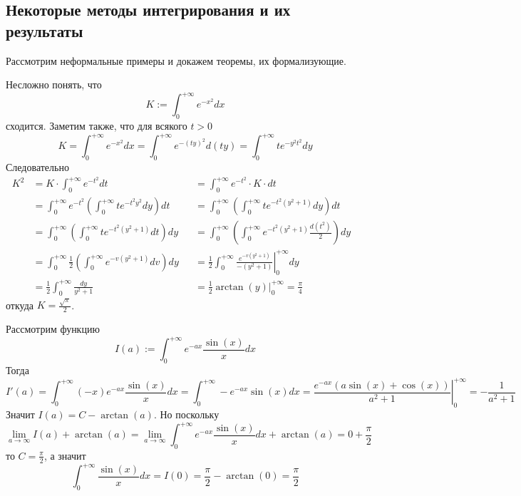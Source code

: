 \documentclass[12pt,a4paper]{article}
\begin{document}
    \subsection{Некоторые методы интегрирования и их результаты}

    Рассмотрим неформальные примеры и докажем теоремы, их формализующие.

    \begin{example}
        Несложно понять, что
        \[K := \int_0^{+\infty} e^{-x^2} dx\]
        сходится. Заметим также, что для всякого $t > 0$
        \[
            K
            = \int_0^{+\infty} e^{-x^2} dx
            = \int_0^{+\infty} e^{-(ty)^2} d(ty)
            = \int_0^{+\infty} t e^{-y^2 t^2} dy
        \]
        Следовательно
        \begin{align*}
            K^2
            &= K \cdot \int_0^{+\infty} e^{-t^2} dt&
            &= \int_0^{+\infty} e^{-t^2} \cdot K \cdot dt\\
            &= \int_0^{+\infty} e^{-t^2} \left(\int_0^{+\infty} t e^{-t^2y^2} dy\right) dt&
            &= \int_0^{+\infty} \left(\int_0^{+\infty} t e^{-t^2(y^2+1)} dy\right) dt\\
            &= \int_0^{+\infty} \left(\int_0^{+\infty} t e^{-t^2(y^2+1)} dt\right) dy&
            &= \int_0^{+\infty} \left(\int_0^{+\infty} e^{-t^2(y^2+1)} \frac{d(t^2)}{2}\right) dy\\
            &= \int_0^{+\infty} \frac{1}{2} \left(\int_0^{+\infty} e^{-v(y^2+1)} dv\right) dy&
            &= \frac{1}{2} \int_0^{+\infty} \left.\frac{e^{-v(y^2+1)}}{-(y^2+1)}\right|_0^{+\infty} dy\\
            &= \frac{1}{2} \int_0^{+\infty} \frac{dy}{y^2+1}&
            &= \frac{1}{2} \left. \arctan(y) \right|_0^{+\infty} = \frac{\pi}{4}&
        \end{align*}
        откуда $K = \frac{\sqrt{\pi}}{2}$.
    \end{example}

    \begin{example}
        Рассмотрим функцию
        \[I(a) := \int_0^{+\infty} e^{-ax} \frac{\sin(x)}{x} dx\]
        Тогда
        \[
            I'(a)
            = \int_0^{+\infty} (-x) e^{-ax} \frac{\sin(x)}{x} dx
            = \int_0^{+\infty} -e^{-ax} \sin(x) dx
            = \left.\frac{e^{-ax}(a \sin(x) + \cos(x))}{a^2 + 1}\right|_0^{+\infty}
            = -\frac{1}{a^2 + 1}
        \]
        Значит $I(a) = C - \arctan(a)$. Но поскольку
        \[
            \lim_{a \to \infty} I(a) + \arctan(a)
            = \lim_{a \to \infty} \int_0^{+\infty} e^{-ax} \frac{\sin(x)}{x} dx + \arctan(a)
            = 0 + \frac{\pi}{2}
        \]
        то $C = \frac{\pi}{2}$, а значит
        \[\int_0^{+\infty} \frac{\sin(x)}{x} dx = I(0) = \frac{\pi}{2} - \arctan(0) = \frac{\pi}{2}\]
    \end{example}
\end{document}
